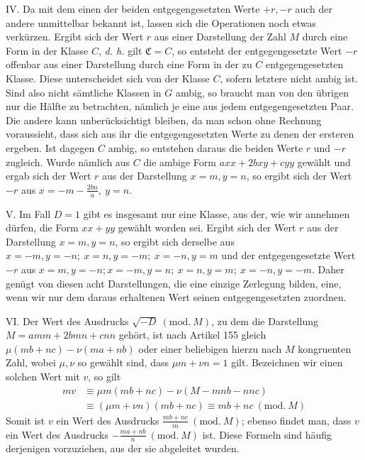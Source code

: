 \begin{samepage}
IV. Da mit dem einen der beiden entgegengesetzten Werte \(+r,\allowbreak -r\) auch der andere unmittelbar bekannt ist, lassen sich die Operationen noch etwas verkürzen. Ergibt sich der Wert \(r\) aus einer Darstellung der Zahl \(M\) durch eine Form in der Klasse \(C\), \textit{d. h.} gilt \(\mathfrak C=C\), so entsteht der entgegengesetzte Wert \(-r\) offenbar aus einer Darstellung durch eine Form in der zu \(C\) entgegengesetzten Klasse. Diese unterscheidet sich von der Klasse \(C\), sofern letztere nicht ambig ist. Sind also nicht sämtliche Klassen in \(G\) ambig, so braucht man von den übrigen nur die Hälfte zu betrachten, nämlich je eine aus jedem entgegengesetzten Paar. Die andere kann unberücksichtigt bleiben, da man schon ohne Rechnung voraussieht, dass sich aus ihr die entgegengesetzten Werte zu denen der ersteren ergeben. Ist dagegen \(C\) ambig, so entstehen daraus die beiden Werte \(r\) und \(-r\) zugleich. Wurde nämlich aus \(C\) die ambige Form
\(axx+2bxy+cyy\) gewählt und ergab sich der Wert \(r\) aus der Darstellung \(x=m,\allowbreak y=n\), so ergibt sich der Wert \(-r\) aus \(x=-m-\frac{2bn}{a},\allowbreak \ y=n\).
\par\end{samepage}

V. Im Fall \(D=1\) gibt es insgesamt nur eine Klasse, aus der, wie wir annehmen dürfen, die Form \(xx+yy\) gewählt worden sei. Ergibt sich der Wert \(r\) aus der Darstellung \(x=m,\allowbreak y=n\), so ergibt sich derselbe aus \(x=-m,\allowbreak y=-n;\allowbreak \ x=n,\allowbreak y=-m;\allowbreak \ x=-n,\allowbreak y=m\) und der entgegengesetzte Wert \(-r\) aus \(x=m,\allowbreak y=-n;\allowbreak x=-m,\allowbreak y=n;\allowbreak \ x=n,\allowbreak y=m;\allowbreak \ x=-n,\allowbreak y=-m\). Daher genügt von diesen acht Darstellungen, die eine einzige Zerlegung bilden, eine, wenn wir nur dem daraus erhaltenen Wert seinen entgegengesetzten zuordnen.

VI. Der Wert des Ausdrucks \(\surd{-D}\ (\mathrm{mod.}\ M)\), zu dem die Darstellung \(M=amm+2bmn+cnn\) gehört, ist nach Artikel 155 gleich \(\mu(mb+nc)-\nu(ma+nb)\) oder einer beliebigen hierzu nach \(M\) kongruenten Zahl, wobei \(\mu,\allowbreak \nu\) so gewählt sind, dass \(\mu m+\nu n=1\) gilt. Bezeichnen wir einen solchen Wert mit \(v\), so gilt \[\begin{aligned}
mv&\equiv\mu m(mb+nc)-\nu(M-mnb-nnc)\\
&\equiv(\mu m+\nu n)(mb+nc)\equiv mb+nc\ (\mathrm{mod.}\ M)
\end{aligned}\] Somit ist \(v\) ein Wert des Ausdrucks \(\frac{mb+nc}{m}\ (\mathrm{mod.}\ M)\); ebenso findet man, dass \(v\) ein Wert des Ausdrucks \(-\frac{ma+nb}{n}\ (\mathrm{mod.}\ M)\) ist. Diese Formeln sind häufig derjenigen vorzuziehen, aus der sie abgeleitet wurden.

